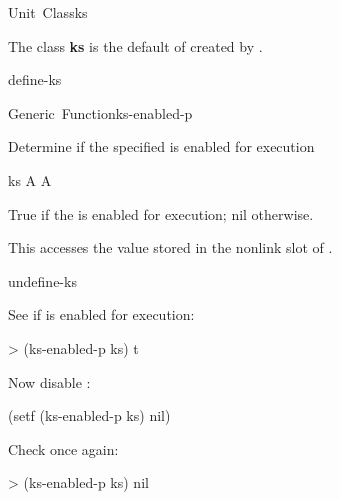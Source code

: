 \documentclass[10pt,twoside,english,pdftex]{article}
\begin{document}

\begin{functiondoc}{Unit~Class}{ks}{}
%
%

\fnsyntax

\fnpackage {}

\fnmodule {}

\fndescription 
{}%
The class \textbf{ks} is the default  of
 created by \textbf{}.

\begin{alsos}{define-ks}
\also[define-ks]
\also[ksa]
\end{alsos}

\end{functiondoc}


\begin{functiondoc}{Generic~Function}{ks-enabled-p}{ 
    \returns{} }
%

\fnsyntax

\fnpurpose Determine if the specified  is enabled for
execution

\fnsetf
{}

\fnmethods
{}

\fnpackage {}

\fnmodule {}

\fnargs
\begin{args}{ks}
\arg[ks] A 
\arg[boolean] A 
\end{args}

\fnreturns True if the  is enabled for execution; nil otherwise.
  
\fndescription 
This  accesses the value stored in the 
 nonlink slot of .

\begin{alsos}{undefine-ks}
\also[define-ks]
\also[ks]
\also[undefine-ks]
\end{alsos}

\fnexamples
See if   is enabled for execution:
%
\W\supp
\begin{example}
> (ks-enabled-p ks)
t
\end{example}
%
Now disable  :
%
\W\supp\notpretop
\begin{example}
  (setf (ks-enabled-p ks) nil)
\end{example}
%
Check once again:
%
\W\supp\notpretop
\begin{example}
> (ks-enabled-p ks)
nil
\end{example}

\end{functiondoc}
\end{document}
